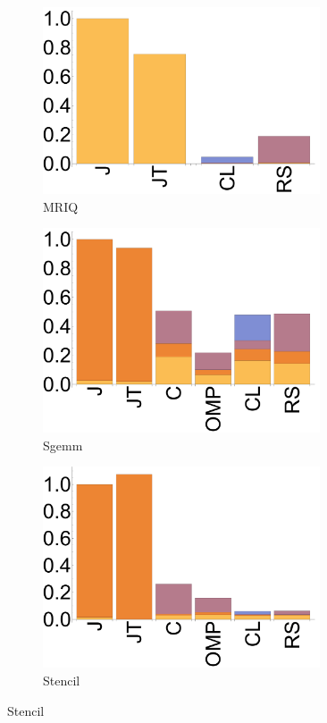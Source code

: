 \begin{figure}[ht]
  \begin{subfigure}[b]{0.3\textwidth}
      \includegraphics[width=0.9\textwidth]{data/bbattery_mriq_nexus5.pdf}
      \caption{MRIQ} \label{fig:MRIQ}
  \end{subfigure}

  \begin{subfigure}[b]{0.3\textwidth}
      \includegraphics[width=0.9\textwidth]{data/bbattery_sgemm_nexus5.pdf}
      \caption{Sgemm}\label{fig:Sgemm}
  \end{subfigure}

  \begin{subfigure}[b]{0.3\textwidth}
      \includegraphics[width=0.9\textwidth]{data/bbattery_stencil_nexus5.pdf}
      \caption{Stencil} \label{fig:Stencil}
  \end{subfigure}


\end{figure}
